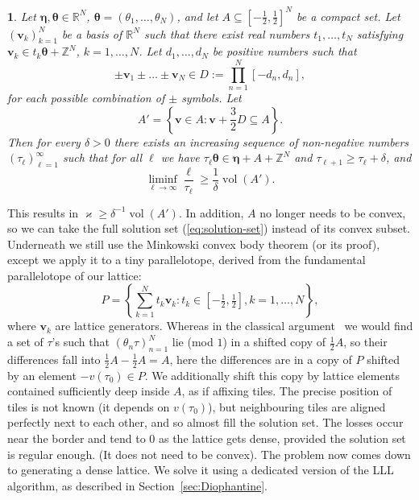 \documentclass[oneside,english]{amsart}
\numberwithin{equation}{section}
\numberwithin{figure}{section}
\theoremstyle{plain}
\newtheorem{thm}{\protect\theoremname}
\theoremstyle{plain}
\theoremstyle{plain}
\theoremstyle{definition}
\providecommand{\theoremname}{Theorem}
\begin{document}
\begin{thm}
\label{thm:Tiling-method}Let $\boldsymbol{\eta},\boldsymbol{\theta}\in\mathbb{R}^{N}$,
$\boldsymbol{\theta}=(\theta_{1},\dotsc,\theta_{N})$, and let $A\subseteq\left[-\tfrac{1}{2},\tfrac{1}{2}\right]^{N}$
be a compact set. Let $(\boldsymbol{v}_{k})_{k=1}^{N}$ be a basis
of $\mathbb{R}^{N}$ such that there exist real numbers $t_{1},\dotsc,t_{N}$
satisfying $\boldsymbol{v}_{k}\in t_{k}\boldsymbol{\theta}+\mathbb{Z}^{N}$,
$k=1,\dotsc,N$. Let $d_{1},\dotsc,d_{N}$ be positive numbers such
that
\[
\pm\boldsymbol{v}_{1}\pm\dotsc\pm\boldsymbol{v}_{N}\in D:=\prod_{n=1}^{N}[-d_{n},d_{n}],
\]
for each possible combination of $\pm$ symbols. Let
\[
A'=\left\{ \boldsymbol{v}\in A:\boldsymbol{v}+\frac{3}{2}D\subseteq A\right\} .
\]
Then for every $\delta>0$ there exists an increasing sequence of
non-negative numbers $(\tau_{\ell})_{\ell=1}^{\infty}$ such that
for all $\ell$ we have $\tau_{\ell}\boldsymbol{\theta}\in\boldsymbol{\eta}+A+\mathbb{Z}^{N}$
and $\tau_{\ell+1}\geq\tau_{\ell}+\delta$, and 
\[
\liminf_{\ell\to\infty}\frac{\ell}{\tau_{\ell}}\geq\frac{1}{\delta}\operatorname{vol}(A').
\]
\end{thm}
This results in $\varkappa\geq\delta^{-1}\operatorname{vol}(A')$.
In addition, $A$ no longer needs to be convex, so we can take the
full solution set (\ref{eq:solution-set}) instead of its convex subset.
Underneath we still use the Minkowski convex body theorem (or its
proof), except we apply it to a tiny parallelotope, derived from the
fundamental parallelotope of our lattice:
\begin{equation}
P=\left\{ \sum_{k=1}^{N}t_{k}\boldsymbol{v}_{k}:t_{k}\in\left[-\tfrac{1}{2},\tfrac{1}{2}\right],k=1,\dotsc,N\right\} ,\label{eq:primitive-cell}
\end{equation}
where $\boldsymbol{v}_{k}$ are lattice generators. Whereas in the
classical argument~\cite[proof of Theorem II in Chapter III]{Cassels1971}
we would find a set of $\tau$'s such that $\left(\theta_{n}\tau\right)_{n=1}^{N}$
lie (mod $1$) in a shifted copy of $\frac{1}{2}A$, so their differences
fall into $\frac{1}{2}A-\frac{1}{2}A=A$, here the differences are
in a copy of $P$ shifted by an element $-v(\tau_{0})\in P$. We additionally
shift this copy by lattice elements contained sufficiently deep inside
$A$, as if affixing tiles. The precise position of tiles is not known
(it depends on $v(\tau_{0})$), but neighbouring tiles are aligned
perfectly next to each other, and so almost fill the solution set.
The losses occur near the border and tend to $0$ as the lattice gets
dense, provided the solution set is regular enough. (It does not need
to be convex). The problem now comes down to generating a dense lattice.
We solve it using a dedicated version of the LLL algorithm, as described
in Section~\ref{sec:Diophantine}. 
\end{document}
